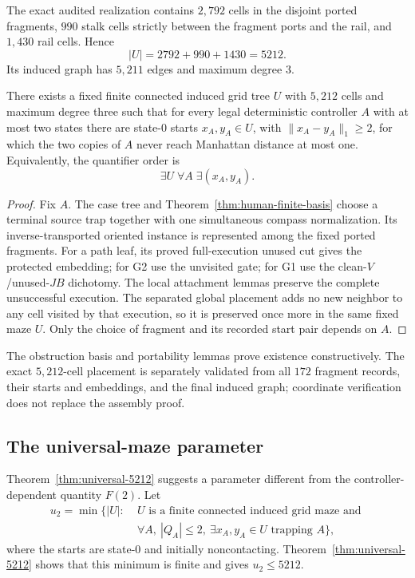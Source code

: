 The exact audited realization contains $2{,}792$ cells in the disjoint ported
fragments, $990$ stalk cells strictly between the fragment ports and the rail, and
$1{,}430$ rail cells.  Hence
\begin{equation}
\label{eq:universal-maze-count}
  |U|=2792+990+1430=5212.
\end{equation}
Its induced graph has $5{,}211$ edges and maximum degree $3$.

\begin{theorem}
\label{thm:universal-5212}
There exists a fixed finite connected induced grid tree $U$ with $5{,}212$ cells and
maximum degree three such that for every legal deterministic controller $A$ with at
most two states there are state-$0$ starts $x_A,y_A\in U$, with
$\|x_A-y_A\|_1\ge2$, for which the two copies of $A$ never reach Manhattan distance
at most one.  Equivalently, the quantifier order is
\[
  \boxed{\exists U\;\forall A\;\exists(x_A,y_A).}
\]
\end{theorem}

\begin{proof}
Fix $A$.  The case tree and Theorem~\ref{thm:human-finite-basis} choose a
terminal source trap together with one simultaneous compass normalization.  Its
inverse-transported oriented instance is represented among the fixed ported fragments.
For a path leaf, its proved full-execution unused cut gives the protected embedding;
for G2 use the unvisited gate; for G1 use the clean-$V$/unused-$JB$ dichotomy.  The
local attachment lemmas preserve the complete unsuccessful execution.  The separated
global placement adds no new neighbor to any cell visited by that execution, so it is
preserved once more in the same fixed maze $U$.  Only the choice of fragment and its
recorded start pair depends on $A$.
\end{proof}

The obstruction basis and portability lemmas prove existence constructively.
The exact $5{,}212$-cell placement is separately validated from all $172$ fragment
records, their starts and embeddings, and the final induced graph; coordinate
verification does not replace the assembly proof.

\subsection{The universal-maze parameter}
\label{subsec:universal-maze-parameter}

Theorem~\ref{thm:universal-5212} suggests a parameter different from the
controller-dependent quantity $F(2)$.  Let
\[
\begin{split}
 u_2=\min\bigl\{|U|:\;& U\text{ is a finite connected induced grid maze and }\\
 &\forall A,\ |Q_A|\le2,\ \exists x_A,y_A\in U\text{ trapping }A\bigr\},
\end{split}
\]
where the starts are state-$0$ and initially noncontacting.  Theorem~\ref{thm:universal-5212}
shows that this minimum is finite and gives $u_2\le5212$.

